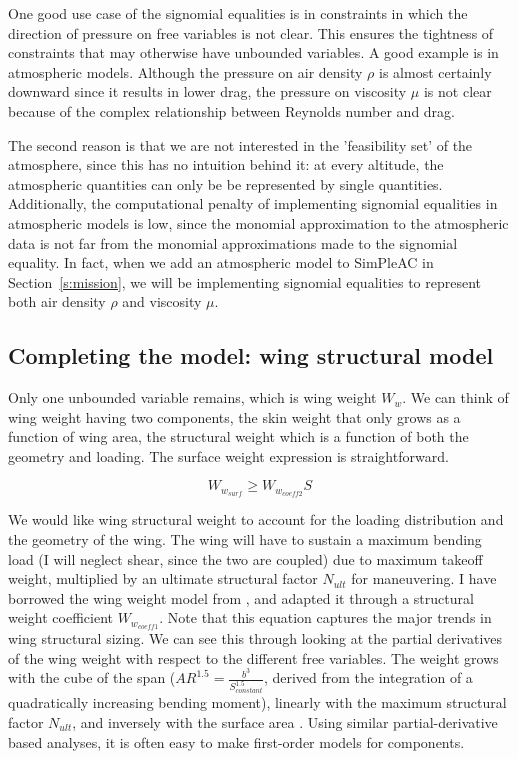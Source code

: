 One good use case of the signomial equalities is in constraints in which the direction
of pressure on free variables is not clear. This ensures the tightness of constraints
that may otherwise have unbounded variables. A good example is in atmospheric models.
Although the pressure on air density $\rho$ is almost certainly downward since it results in
lower drag, the pressure on viscosity $\mu$ is not clear because of the complex relationship
between Reynolds number and drag.

The second reason is that we are not interested in the 'feasibility set' of the atmosphere,
since this has no intuition behind it: at every altitude, the atmospheric quantities
can only be be represented by single quantities. Additionally, the computational penalty of
implementing signomial equalities in atmospheric models is low, since the monomial approximation
to the atmospheric data is not far from the monomial approximations made to the signomial equality.
In fact, when we add an atmospheric model to SimPleAC in
Section~\ref{s:mission}, we will be implementing signomial equalities to represent both air density
$\rho$ and viscosity $\mu$.

\subsection{Completing the model: wing structural model}
\label{s:wingstrc}

Only one unbounded variable remains, which is wing weight $W_w$. We can think
of wing weight having two components, the skin weight that
only grows as a function of wing area, the structural weight which is a function of
both the geometry and loading. The surface weight expression is straightforward.

\begin{equation} W_{w_{surf}} \geq W_{w_{coeff2}} S \label{e:wwsurf} \end{equation}

We would like wing structural weight to account for the loading distribution and the geometry
of the wing. The wing will have to sustain a maximum bending load (I will neglect shear, since
the two are coupled) due to maximum takeoff weight,
multiplied by an ultimate structural factor $N_{ult}$ for maneuvering.
I have borrowed the wing weight model from \cite{gp_ac_design}, and adapted it through a
structural weight coefficient $W_{w_{coeff1}}$. Note that this equation captures the
major trends in wing structural sizing. We can see this through looking at the partial
derivatives of the wing weight with respect to the different free variables.
The weight grows with the cube of the span ($AR^{1.5} = \frac{b^3}{S_{constant}^{1.5}}$, derived
from the integration of a quadratically increasing bending moment),
linearly with the maximum structural factor $N_{ult}$, and inversely with the
surface area \footnotemark. Using similar partial-derivative based analyses, it
is often easy to make first-order models for components.

